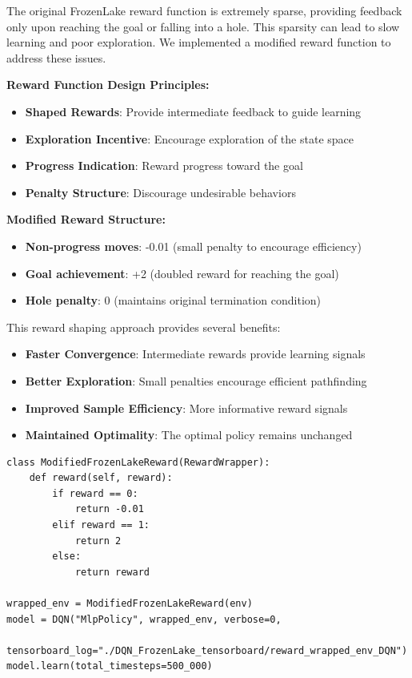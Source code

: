 \documentclass[12pt]{article}
\begin{document}
{{{The original FrozenLake reward function is extremely sparse, providing feedback only upon reaching the goal or falling into a hole. This sparsity can lead to slow learning and poor exploration. We implemented a modified reward function to address these issues.

\textbf{Reward Function Design Principles:}
\begin{itemize}
    \item \textbf{Shaped Rewards}: Provide intermediate feedback to guide learning
    \item \textbf{Exploration Incentive}: Encourage exploration of the state space
    \item \textbf{Progress Indication}: Reward progress toward the goal
    \item \textbf{Penalty Structure}: Discourage undesirable behaviors
\end{itemize}

\textbf{Modified Reward Structure:}
\begin{itemize}
    \item \textbf{Non-progress moves}: -0.01 (small penalty to encourage efficiency)
    \item \textbf{Goal achievement}: +2 (doubled reward for reaching the goal)
    \item \textbf{Hole penalty}: 0 (maintains original termination condition)
\end{itemize}

This reward shaping approach provides several benefits:
\begin{itemize}
    \item \textbf{Faster Convergence}: Intermediate rewards provide learning signals
    \item \textbf{Better Exploration}: Small penalties encourage efficient pathfinding
    \item \textbf{Improved Sample Efficiency}: More informative reward signals
    \item \textbf{Maintained Optimality}: The optimal policy remains unchanged
\end{itemize}

\begin{verbatim}
class ModifiedFrozenLakeReward(RewardWrapper):
    def reward(self, reward):
        if reward == 0:            
            return -0.01
        elif reward == 1:           
            return 2
        else:
            return reward

wrapped_env = ModifiedFrozenLakeReward(env)
model = DQN("MlpPolicy", wrapped_env, verbose=0, 
           tensorboard_log="./DQN_FrozenLake_tensorboard/reward_wrapped_env_DQN")
model.learn(total_timesteps=500_000)
\end{verbatim}

}}}
\end{document}
